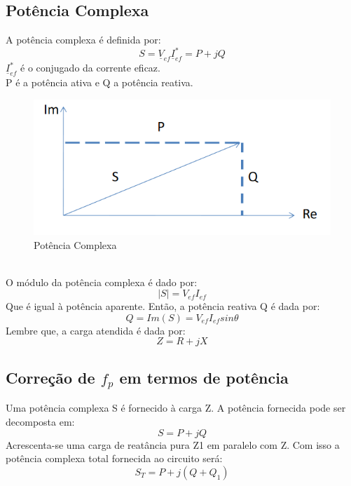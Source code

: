 \documentclass[a4paper, 12pt]{article}
\begin{document}
	\subsection{Potência Complexa}
		A potência complexa é definida por:
		\begin{equation}
			S = \underline{V}_{ef}\underline{I}_{ef}^* = P + jQ
		\end{equation}
		$\underline{I}_{ef}^*$ é o conjugado da corrente eficaz.\\
		P é a potência ativa e Q a potência reativa.
		\begin{figure}[h]
			\centering
			\includegraphics[scale=0.5]{a1.png}
			\caption{Potência Complexa}
		\end{figure}\\
		O módulo da potência complexa é dado por:
			\begin{equation}
				|S| = V_{ef}I_{ef}
			\end{equation}
		Que é igual à potência aparente. Então, a potência reativa Q é dada por:
			\begin{equation}
				Q = Im (S) = V_{ef}I_{ef}sin\theta
			\end{equation}
		Lembre que, a carga atendida é dada por:
			\begin{equation}
				Z = R + jX
			\end{equation}
	
	\subsection{Correção de $f_p$ em termos de potência}
		Uma potência complexa S é fornecido à carga Z. A potência fornecida pode ser decomposta em:
			\begin{equation}
				S = P + jQ
			\end{equation}
			Acrescenta-se uma carga de reatância pura Z1 em paralelo com Z. Com isso a potência complexa total fornecida ao circuito será:
			\begin{equation}
				S_T = P + j(Q + Q_1)
			\end{equation}
\end{document}
